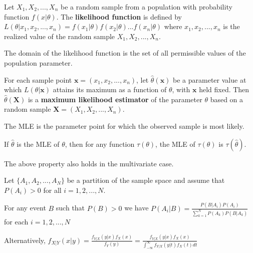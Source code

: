 \begin{defn}
    Let $X_1, X_2, ..., X_n$ be a random sample from a population with probability function $f(x|\theta)$.
    The \textbf{likelihood function} is defined by $L(\theta|x_1, x_2, ..., x_n) = f(x_1|\theta) f(x_2|\theta) ... f(x_n|\theta)$ where $x_1, x_2, ..., x_n$ is the realized value of the random sample $X_1, X_2, ..., X_n$.
\end{defn}

\begin{note}
    The domain of the likelihood function is the set of all permissible values of the population parameter.
\end{note}

\begin{defn}
    For each sample point $\bm{x} = (x_1, x_2, ..., x_n)$, let $\hat{\theta}(\bm{x})$ be a parameter value at which $L(\theta|\bm{x})$ attains its maximum as a function of $\theta$, with $\bm{x}$ held fixed. Then $\hat{\theta}(\bm{X})$ is a \textbf{maximum likelihood estimator} of the parameter $\theta$ based on a random sample $\bm{X} = (X_1, X_2, ..., X_n)$.
\end{defn}

\begin{note}
    The MLE is the parameter point for which the observed sample is most likely.
\end{note}

\begin{thm}
    If $\hat{\theta}$ is the MLE of $\theta$, then for any function $\tau(\theta)$, the MLE of $\tau(\theta)$ is $\tau(\hat{\theta})$.
\end{thm}

\begin{note}
    The above property also holds in the multivariate case.
\end{note}

\begin{thm}
    Let $\{ A_1, A_2, ..., A_N \}$ be a partition of the sample space and assume that $P(A_i) > 0$ for all $i = 1,2, ..., N$. 

    For any event $B$ such that $P(B) > 0$ we have $P(A_i | B) = \frac{P(B|A_i)P(A_i)}{\sum_{k=1}^N P(A_k) P(B|A_k)}$ for each $i = 1, 2, ..., N$


    Alternatively, $f_{X|Y}(x|y) = \frac{f_{Y|X}(y|x) f_X(x)}{f_Y(y)} = \frac{f_{Y|X} (y|x) f_X(x)}{\int_{-\infty}^{\infty} f_{Y|X} (y|t) f_X(t) dt }$
\end{thm}

